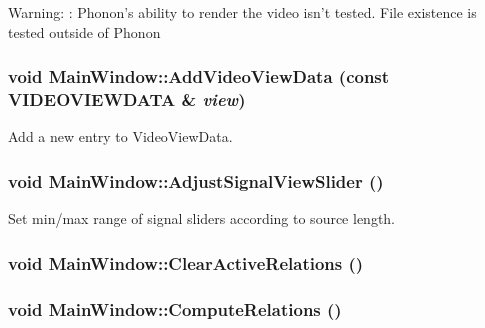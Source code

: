\begin{Desc}
\item[Warning:]: Phonon's ability to render the video isn't tested. File existence is tested outside of Phonon \end{Desc}
\hypertarget{class_main_window_3b6665baf224885d9ed51f66aed413d4}{
\subsubsection[{AddVideoViewData}]{\setlength{\rightskip}{0pt plus 5cm}void MainWindow::AddVideoViewData (const {\bf VIDEOVIEWDATA} \& {\em view})}}
\label{class_main_window_3b6665baf224885d9ed51f66aed413d4}


Add a new entry to VideoViewData. 

\hypertarget{class_main_window_ef0316ae76a2a44a6d82e7b712e0d32a}{
\subsubsection[{AdjustSignalViewSlider}]{\setlength{\rightskip}{0pt plus 5cm}void MainWindow::AdjustSignalViewSlider ()}}
\label{class_main_window_ef0316ae76a2a44a6d82e7b712e0d32a}


Set min/max range of signal sliders according to source length. 

\hypertarget{class_main_window_988229efc0dea58df8ef6cd5d51a6854}{
\subsubsection[{ClearActiveRelations}]{\setlength{\rightskip}{0pt plus 5cm}void MainWindow::ClearActiveRelations ()}}
\label{class_main_window_988229efc0dea58df8ef6cd5d51a6854}


\hypertarget{class_main_window_a052e33dc4ba5663fe765cafb3d64c2d}{
\subsubsection[{ComputeRelations}]{\setlength{\rightskip}{0pt plus 5cm}void MainWindow::ComputeRelations ()}}
\label{class_main_window_a052e33dc4ba5663fe765cafb3d64c2d}


